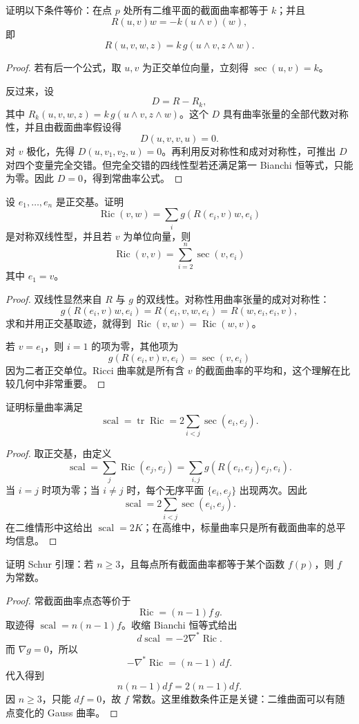 \documentclass[11pt,a4paper,openany]{ctexbook}
\numberwithin{equation}{chapter}
\begin{document}
\begin{problem}
证明以下条件等价：在点 \(p\) 处所有二维平面的截面曲率都等于 \(k\)；并且
\[
R(u,v)w=-k(u\wedge v)(w),
\]
即
\[
R(u,v,w,z)=k\,g(u\wedge v,z\wedge w).
\]
\end{problem}
\begin{proof}
若有后一个公式，取 \(u,v\) 为正交单位向量，立刻得 \(\operatorname{sec}(u,v)=k\)。

反过来，设
\[
D=R-R_k,
\]
其中 \(R_k(u,v,w,z)=k\,g(u\wedge v,z\wedge w)\)。这个 \(D\) 具有曲率张量的全部代数对称性，并且由截面曲率假设得
\[
D(u,v,v,u)=0.
\]
对 \(v\) 极化，先得 \(D(u,v_1,v_2,u)=0\)。再利用反对称性和成对对称性，可推出 \(D\) 对四个变量完全交错。但完全交错的四线性型若还满足第一 Bianchi 恒等式，只能为零。因此 \(D=0\)，得到常曲率公式。
\end{proof}

\begin{problem}
设 \(e_1,\ldots,e_n\) 是正交基。证明
\[
\operatorname{Ric}(v,w)=\sum_i g(R(e_i,v)w,e_i)
\]
是对称双线性型，并且若 \(v\) 为单位向量，则
\[
\operatorname{Ric}(v,v)=\sum_{i=2}^n \operatorname{sec}(v,e_i)
\]
其中 \(e_1=v\)。
\end{problem}
\begin{proof}
双线性显然来自 \(R\) 与 \(g\) 的双线性。对称性用曲率张量的成对对称性：
\[
g(R(e_i,v)w,e_i)=R(e_i,v,w,e_i)=R(w,e_i,e_i,v),
\]
求和并用正交基取迹，就得到 \(\operatorname{Ric}(v,w)=\operatorname{Ric}(w,v)\)。

若 \(v=e_1\)，则 \(i=1\) 的项为零，其他项为
\[
g(R(e_i,v)v,e_i)=\operatorname{sec}(v,e_i)
\]
因为二者正交单位。Ricci 曲率就是所有含 \(v\) 的截面曲率的平均和，这个理解在比较几何中非常重要。
\end{proof}

\begin{problem}
证明标量曲率满足
\[
\operatorname{scal}=\operatorname{tr}\operatorname{Ric}
=2\sum_{i<j}\operatorname{sec}(e_i,e_j).
\]
\end{problem}
\begin{proof}
取正交基，由定义
\[
\operatorname{scal}=\sum_j\operatorname{Ric}(e_j,e_j)
=\sum_{i,j}g(R(e_i,e_j)e_j,e_i).
\]
当 \(i=j\) 时项为零；当 \(i\ne j\) 时，每个无序平面 \(\{e_i,e_j\}\) 出现两次。因此
\[
\operatorname{scal}=2\sum_{i<j}\operatorname{sec}(e_i,e_j).
\]
在二维情形中这给出 \(\operatorname{scal}=2K\)；在高维中，标量曲率只是所有截面曲率的总平均信息。
\end{proof}

\begin{problem}
证明 Schur 引理：若 \(n\ge3\)，且每点所有截面曲率都等于某个函数 \(f(p)\)，则 \(f\) 为常数。
\end{problem}
\begin{proof}
常截面曲率点态等价于
\[
\operatorname{Ric}=(n-1)f\,g.
\]
取迹得 \(\operatorname{scal}=n(n-1)f\)。收缩 Bianchi 恒等式给出
\[
d\operatorname{scal}=-2\nabla^*\operatorname{Ric}.
\]
而 \(\nabla g=0\)，所以
\[
-\nabla^*\operatorname{Ric}=(n-1)\,df.
\]
代入得到
\[
n(n-1)df=2(n-1)df.
\]
因 \(n\ge3\)，只能 \(df=0\)，故 \(f\) 常数。这里维数条件正是关键：二维曲面可以有随点变化的 Gauss 曲率。
\end{proof}
\end{document}
